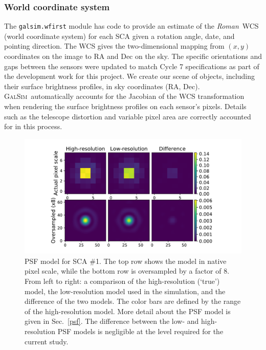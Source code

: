 \documentclass[usenatbib]{mnras}
\newcommand{\galsim}{\textsc{GalSim}}
\newcommand{\wfirst}{{\slshape Roman}}
\begin{document}
\subsubsection{World coordinate system}\label{wcs}

The \texttt{galsim.wfirst} module has code to provide an estimate of the \wfirst\ WCS (world coordinate system) for each SCA given a rotation angle, date, and pointing direction.  
The WCS gives the two-dimensional mapping from $(x,y)$ coordinates on the image to RA and Dec on the sky.
The specific orientations and gaps between the sensors were updated to match Cycle 7 specifications as part of the development work for this project.
We create our scene of objects, including their surface brightness profiles, in sky coordinates (RA, Dec).
\galsim\ automatically accounts for the Jacobian of the WCS transformation when rendering the surface brightness profiles on each sensor's pixels.  
Details such as the telescope distortion and variable pixel area are correctly accounted for in this process.

\begin{figure}
\begin{center}
\includegraphics[width=\columnwidth]{figures/psf.pdf}
\end{center}
\caption[]{
PSF model for SCA \#1. The top row shows the model in native pixel scale, while the bottom row is oversampled by a factor of 8. From left to right: a comparison of the high-resolution (`true') model, the low-resolution model used in the simulation, and the difference of the two models. The color bars are defined by the range of the high-resolution model. More detail about the PSF model is given in Sec.~\ref{psf}. The difference between the low- and high-resolution PSF models is negligible at the level required for the current study.
\label{fig:psf}}
\end{figure}
\end{document}
